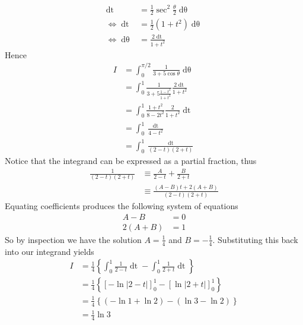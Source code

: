 \documentclass[12pt,oneside]{book}
\begin{document}
\begin{enumerate}
\begin{enumerate}
\begin{align*}
                \mathop{\mathrm{d}t} &= \frac{1}{2} \sec^2 \frac{\theta}{2} \mathop{\mathrm{d}\theta} \\
                \iff \mathop{\mathrm{d}t} &= \frac{1}{2} (1 + t^2) \mathop{\mathrm{d}\theta} \\
                \iff \mathop{\mathrm{d}\theta} &= \frac{2 \mathop{\mathrm{d}t}}{1 + t^2}
            \end{align*} Hence \begin{align*}
                I &= \int_{0}^{\pi/2} \frac{1}{3+5\cos \theta} \mathop{\mathrm{d}\theta} \\
                &= \int_{0}^{1} \frac{1}{3+5 \frac{1 - t^2}{1 + t^2}} \frac{2 \mathop{\mathrm{d}t} }{1 + t^2} \\
                &= \int_{0}^{1} \frac{1 + t^2}{8 - 2t^2} \frac{2}{1 + t^2} \mathop{\mathrm{d}t} \\
                &= \int_{0}^{1} \frac{\mathop{\mathrm{d}t} }{4-t^2}\\
                &= \int_{0}^{1} \frac{\mathop{\mathrm{d}t}}{(2 - t)(2 + t)}     
            \end{align*}
            Notice that the integrand can be expressed as a partial fraction, thus \begin{align*}
                \frac{1}{(2-t)(2+t)} &\equiv \frac{A}{2-t} + \frac{B}{2+t} \\
                &\equiv \frac{(A - B) t + 2(A + B)}{(2-t)(2+t)}
            \end{align*}
            Equating coefficients produces the following system of equations \begin{align*}
                A - B &= 0 \\
                2 (A + B) &= 1
            \end{align*}
            So by inspection we have the solution $A = \frac{1}{4}$ and $B = - \frac{1}{4}$. Substituting this back into our integrand yields \begin{align*}
                I &= \frac{1}{4} \left\{ \int_{0}^{1} \frac{1}{2 - t} \mathop{\mathrm{d}t} - \int_{0}^{1} \frac{1}{2 + t} \mathop{\mathrm{d}t} \right\}  \\
                &= \frac{1}{4} \left\{ \left[  - \ln | 2 - t | \right]_0^1 - \left[ \ln \left| 2 + t \right| \right]_0^1 \right\} \\
                &= \frac{1}{4} \left\{ \left( - \ln 1 + \ln 2 \right) - \left( \ln 3 - \ln 2 \right) \right\} \\
                &= \frac{1}{4} \ln 3

\end{align*}
\end{enumerate}
\end{enumerate}
\end{document}
